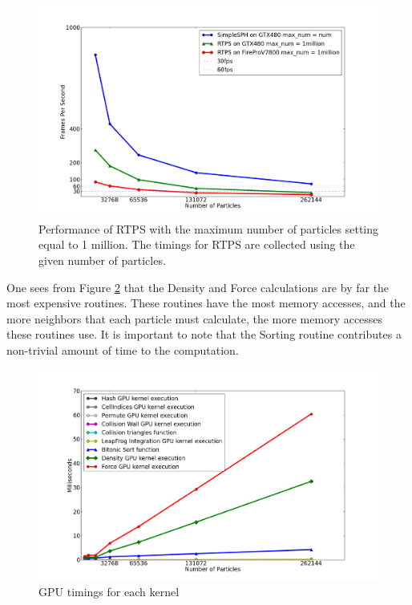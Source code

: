 \begin{figure}[!htc]
 		\centering
        \includegraphics[width=\columnwidth]{figures/maxnum_eq_1mill_fps.png}
        \caption{ {\small Performance of RTPS with the maximum number of particles
        setting equal to 1 million. The timings for RTPS are collected using
        the given number of particles.}}
        \label{fig:fps_1mill}
\end{figure}

\newpage
One sees from Figure \ref{fig:kernel_time} that the Density and Force calculations are by far
the most expensive routines. These routines have the most memory accesses, and
the more neighbors that each particle must calculate, the more memory accesses
these routines use. It is important to note that the Sorting routine
contributes a non-trivial amount of time to the computation.


\begin{figure}[!htc]
 		\centering
		\includegraphics[width=\columnwidth]{figures/nv_kernel_num.png}
        \caption{ GPU timings for each kernel }
        \label{fig:kernel_time}
\end{figure}

